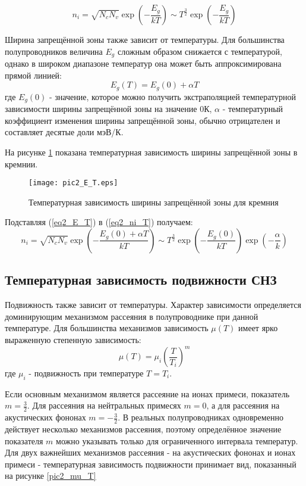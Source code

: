 \begin{equation}
n_{i} = \sqrt{N_{c} N_{v}} \exp{\left( -\frac{E_{g}}{k T} \right)} \sim T^{\frac{3}{2}} \exp{\left( -\frac{E_{g}}{k T} \right)}
\label{eq2_ni_T}
\end{equation}

Ширина запрещённой зоны также зависит от температуры. Для большинства полупроводников величина $E_{g}$ сложным образом снижается с температурой, однако в широком диапазоне температур она может быть аппроксимирована прямой линией:
\begin{equation}
E_{g}(T) = E_{g}(0) + \alpha T
\label{eq2_E_T}
\end{equation}
где $E_{g}(0)$ - значение, которое можно получить экстраполяцией температурной зависимости ширины запрещённой зоны на значение 0\textdegree К, $\alpha$ - температурный коэффициент изменения ширины запрещённой зоны, обычно отрицателен и составляет десятые доли мэВ/К.

На рисунке \ref{pic2_E_T} показана температурная зависимость ширины запрещённой зоны в кремнии.

\begin{figure}[h!]\centering
\texttt{[image: pic2\_E\_T.eps]}
\caption{Температурная зависимость ширины запрещённой зоны для кремния}
\label{pic2_E_T}
\end{figure}

Подставляя (\ref{eq2_E_T}) в (\ref{eq2_ni_T}) получаем:
\begin{equation}
n_{i} = \sqrt{N_{c} N_{v}} \exp{\left( -\frac{E_{g}(0) + \alpha T}{k T} \right)} \sim T^{\frac{3}{2}} \exp{\left( -\frac{E_{g}(0)}{k T} \right)} \exp{\left( -\frac{\alpha}{k} \right)}
\label{eq2_ni_T}
\end{equation}

\subsection{Температурная зависимость подвижности СНЗ}
Подвижность также зависит от температуры. Характер зависимости определяется доминирующим механизмом рассеяния в полупроводнике при данной температуре. Для большинства механизмов зависимость $\mu(T)$ имеет ярко выраженную степенную зависимость:
\begin{equation}
\mu(T) = \mu_{i} \left( \frac{T}{T_{i}} \right)^{m}
\end{equation}
где $\mu_{i}$ - подвижность при температуре $T = T_{i}$.

Если основным механизмом является рассеяние на ионах примеси, показатель $m = \frac{3}{2}$. Для рассеяния на нейтральных примесях $m = 0$, а для рассеяния на акустических фононах $m = -\frac{3}{2}$. В реальных полупроводниках одновременно действует несколько механизмов рассеяния, поэтому определённое значение показателя $m$ можно указывать только для ограниченного интервала температур. Для двух важнейших механизмов рассеяния - на акустических фононах и ионах примеси - температурная зависимость подвижности принимает вид, показанный на рисунке \ref{pic2_mu_T}

